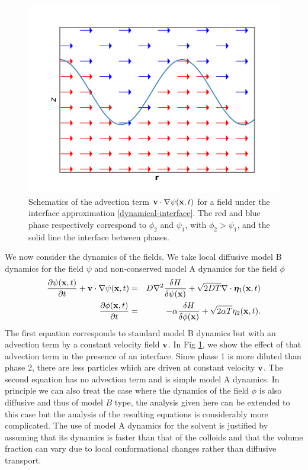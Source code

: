 \begin{figure}
    \centering
    \includegraphics[width=0.7\linewidth]{drivenC/driven.pdf}
    \caption{Schematics of the advection term ${\bf v}\cdot { \nabla}\psi({\bf x},t)$ for a field under the interface approximation \eqref{dynamical-interface}. The red and blue phase respectively correspond to $\phi_2$ and $\psi_1$, with $\phi_2 \greater \psi_1$, and the solid line the interface between phases.}
    \label{fig-driven}    
\end{figure}

We now consider the dynamics of the fields. We take local diffusive model B dynamics for the field $\psi$ and non-conserved model A dynamics for the field $\phi$
\begin{eqnarray}
\frac{\partial \psi({\bf x},t)}{\partial t} +{\bf v}\cdot { \nabla}\psi({\bf x},t)&=& D\nabla^2\frac{\delta H}{\delta \psi({\bf x})}+ \sqrt{2D T}\nabla \cdot {\bm \eta}_1({\bf x},t) \\
\frac{\partial \phi({\bf x},t)}{\partial t} &=& -\alpha\frac{\delta H}{\delta \phi({\bf x})}+ \sqrt{2\alpha T}{ \eta}_2({\bf x},t).
\end{eqnarray}
The first equation corresponds to standard model B dynamics but with an advection term by a constant velocity field $\bf v$. 
In Fig \ref{fig-driven}, we show the effect of that advection term in the presence of an interface. Since phase 1 is more diluted than phase 2, there are less particles which are driven at constant velocity ${\bf v}$.
The second equation has no advection term and is simple model A dynamics. In principle we can also treat the case where the dynamics of the field $\phi$ is also diffusive and thus of model $B$ type, the analysis given here can be extended to this case but the analysis of the resulting equations is considerably more complicated. The use of model A dynamics for the solvent is justified by assuming that its dynamics is faster than that of the colloids and that the volume fraction can vary due to local conformational changes rather than  diffusive transport.

